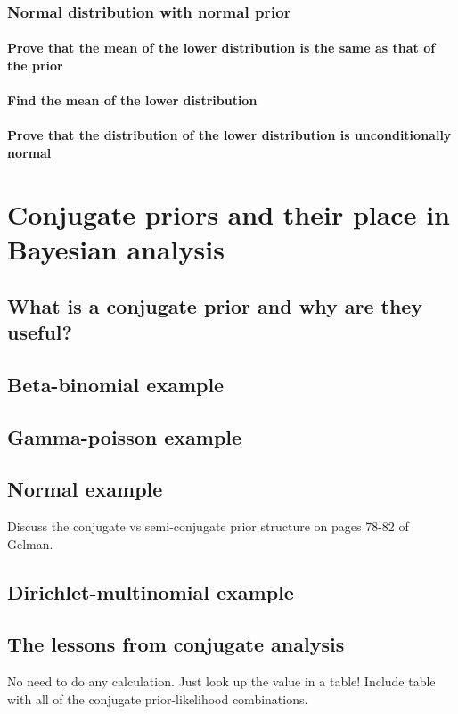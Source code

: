 \documentclass[11pt,fullpage]{book}
\begin{document}
\subsection{Normal distribution with normal prior}
\subsubsection{Prove that the mean of the lower distribution is the same as that of the prior}
\subsubsection{Find the mean of the lower distribution}
\subsubsection{Prove that the distribution of the lower distribution is unconditionally normal}

\chapter{Conjugate priors and their place in Bayesian analysis}\label{chap:conjugate}
\section{What is a conjugate prior and why are they useful?}
\section{Beta-binomial example}
\section{Gamma-poisson example}
\section{Normal example}\label{sec:conjugate_normal}
Discuss the conjugate vs semi-conjugate prior structure on pages 78-82 of Gelman.

\section{Dirichlet-multinomial example}
\section{The lessons from conjugate analysis}
No need to do any calculation. Just look up the value in a table!
Include table with all of the conjugate prior-likelihood combinations.
\end{document}
